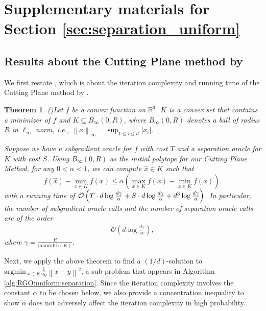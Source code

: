 \documentclass[11pt,letterpaper]{article}
\newcommand{\R}{\mathbb{R}}
\newcommand{\norm}[1]{\left\lVert #1 \right\rVert}
\newcommand{\abs}[1]{\left\vert #1 \right\rvert}
\newcommand{\argmin}{\mathrm{argmin}\,}
\newcommand{\brac}[1]{\left( #1\right)}
\newtheorem{theorem}[thm]{Theorem}
\begin{document}
\section{Supplementary materials for Section \ref{sec:separation_uniform}}
\label{appendix:secseparation}

\subsection{Results about the Cutting Plane method by \cite{jiang2020cuttingplane}}
\label{appendix:cuttingplane}

We first restate \cite[Theorem~C.1]{jiang2020cuttingplane}, which is about the iteration complexity and running time of the Cutting Plane method by \cite{jiang2020cuttingplane}. 

\begin{theorem}(\cite[Theorem~C.1]{jiang2020cuttingplane})\label{theo:jiang} Let $f$ be a convex function on $\R^d$. $K$ is a convex set that contains a minimizer
of $f$ and $K\subseteq B_\infty (0,R)$, where $B_\infty (0,R)$ denotes a ball of radius $R$ in $\ell_\infty$ norm, i.e., $\norm{x}_\infty=\sup_{1\leq i\leq d}\abs{x_i}$. 

Suppose we have a subgradient oracle for $f$ with cost $T$ and a separation oracle for $K$ with cost $S$. Using $B_\infty (0,R)$ as the initial polytope for our Cutting Plane Method, for any $0< \alpha<1$, we can compute $\hat x\in K$ such that 
\begin{equation}\label{ineq:opt}
f(\hat x)-\min_{x \in K} f(x) \le \alpha \left(\max_{x \in K} f(x)-\min_{x \in K} f(x)\right).    
\end{equation}
with a running time of $ {\cal O}\left(T\cdot d \log \frac{d \gamma}{\alpha}+S\cdot  d \log \frac{d \gamma}{\alpha}+d^3\log \frac{d \gamma}{\alpha}\right)$. In particular, the number of subgradient oracle calls and the number of separation oracle calls are of the order 
\begin{align*}
    \mathcal{O}\brac{d \log \frac{d \gamma}{\alpha}}, 
\end{align*}
where $\gamma=\frac{R}{\mbox{minwidth}(K)}$.
\end{theorem}

Next, we apply the above theorem to find a $(1/d)$-solution to $ \argmin_{x\in K} \frac{1}{2\eta}\norm{x-y}^2$, a sub-problem that appears in Algorithm \ref{alg:RGO:uniform:separation}. Since the iteration complexity involves the constant $\alpha$ to be chosen below, we also provide a concentration inequality to show $\alpha$ does not adversely affect the iteration complexity in high probability.
\end{document}
